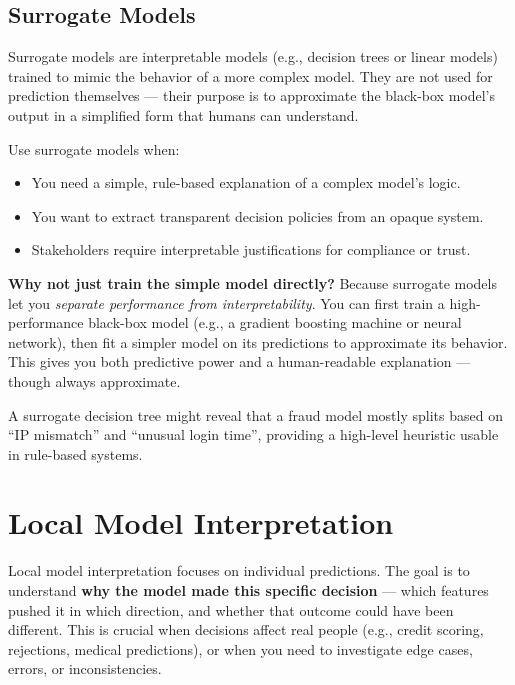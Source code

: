 \documentclass[12pt,openany]{book}
\begin{document}
\section{Surrogate Models}

Surrogate models are interpretable models (e.g., decision trees or linear models) trained to mimic the behavior of a more complex model. They are not used for prediction themselves — their purpose is to approximate the black-box model’s output in a simplified form that humans can understand.

Use surrogate models when:
\begin{itemize}
  \item You need a simple, rule-based explanation of a complex model’s logic.
  \item You want to extract transparent decision policies from an opaque system.
  \item Stakeholders require interpretable justifications for compliance or trust.
\end{itemize}

\textbf{Why not just train the simple model directly?} Because surrogate models let you \textit{separate performance from interpretability}. You can first train a high-performance black-box model (e.g., a gradient boosting machine or neural network), then fit a simpler model on its predictions to approximate its behavior. This gives you both predictive power and a human-readable explanation — though always approximate.

\begin{examplebox}
A surrogate decision tree might reveal that a fraud model mostly splits based on ``IP mismatch'' and ``unusual login time'', providing a high-level heuristic usable in rule-based systems.
\end{examplebox}




\chapter{Local Model Interpretation}

Local model interpretation focuses on individual predictions. The goal is to understand \textbf{why the model made this specific decision} — which features pushed it in which direction, and whether that outcome could have been different. This is crucial when decisions affect real people (e.g., credit scoring, rejections, medical predictions), or when you need to investigate edge cases, errors, or inconsistencies.
\end{document}
